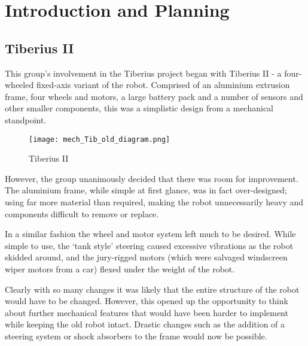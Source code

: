 \section{Introduction and Planning}
\subsection{Tiberius II}

This group's involvement in the Tiberius project began with Tiberius II - a four-wheeled fixed-axis variant of the robot. Comprised of an aluminium extrusion frame, four wheels and motors, a large battery pack and a number of sensors and other smaller components, this was a simplistic design from a mechanical standpoint.

\begin{figure}[!htb]
\begin{center}
\texttt{[image: mech\_Tib\_old\_diagram.png]}
\end{center}
\caption{Tiberius II}
\label{fig:mech_old}
\end{figure}

However, the group unanimously decided that there was room for improvement. The aluminium frame, while simple at first glance, was in fact over-designed; using far more material than required, making the robot unnecessarily heavy and components difficult to remove or replace.

In a similar fashion the wheel and motor system left much to be desired. While simple to use, the `tank style' steering caused excessive vibrations as the robot skidded around, and the jury-rigged motors (which were salvaged windscreen wiper motors from a car) flexed under the weight of the robot.
%
%

Clearly with so many changes it was likely that the entire structure of the robot would have to be changed. However, this opened up the opportunity to think about further mechanical features that would have been harder to implement while keeping the old robot intact. Drastic changes such as the addition of a steering system or shock absorbers to the frame would now be possible.

